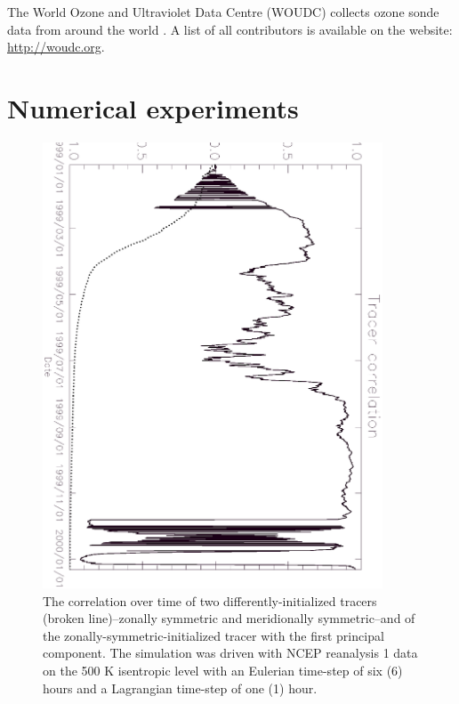 \documentclass{article}
\begin{document}
The World Ozone and Ultraviolet Data Centre (WOUDC) collects ozone sonde data
from around the world \citep{Hare_etal2000}. A list of all contributors is available on the website:
\url{http://woudc.org}.


\section{Numerical experiments}

\begin{figure}
\begin{center}
\includegraphics[angle=90,width=0.9\textwidth]{../pc_proxy/tcorr.eps}
\caption{The correlation over time of two differently-initialized tracers
(broken line)--zonally symmetric and meridionally symmetric--and of
the zonally-symmetric-initialized tracer with the first principal component.
The simulation was driven with NCEP reanalysis 1 data on the 500 K isentropic
level with an Eulerian time-step of six (6) hours and a Lagrangian time-step
of one (1) hour.}\label{tcorr}
\end{center}
\end{figure}
\end{document}
